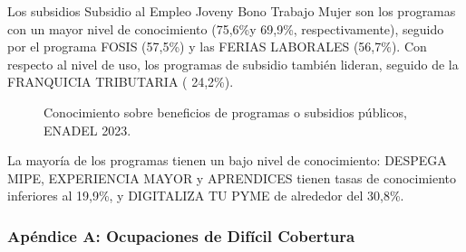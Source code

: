 \documentclass[
  11pt,
]{article}
\begin{document}
Los subsidios Subsidio al Empleo Joveny Bono Trabajo Mujer son los
programas con un mayor nivel de conocimiento (75,6\%y 69,9\%,
respectivamente), seguido por el programa FOSIS (57,5\%) y las FERIAS
LABORALES (56,7\%). Con respecto al nivel de uso, los programas de
subsidio también lideran, seguido de la FRANQUICIA TRIBUTARIA ( 24,2\%).

\begin{figure}[H]

\caption{\label{fig-conocimiento_2}Conocimiento sobre beneficios de
programas o subsidios públicos, ENADEL 2023.}


\end{figure}%

La mayoría de los programas tienen un bajo nivel de conocimiento:
DESPEGA MIPE, EXPERIENCIA MAYOR y APRENDICES tienen tasas de
conocimiento inferiores al 19,9\%, y DIGITALIZA TU PYME de alrededor del
30,8\%.

\subsubsection{Apéndice A: Ocupaciones de Difícil
Cobertura}\label{apuxe9ndice-a-ocupaciones-de-difuxedcil-cobertura}
\end{document}
